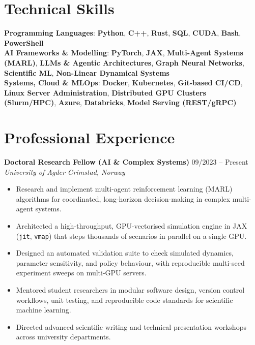 \documentclass[10pt,a4paper]{article}
\begin{document}
\section{Technical Skills}
\begin{itemize}[leftmargin=0.15in, label={}]
    \small{\item{
     \textbf{Programming Languages}{: \textbf{Python}, \textbf{C++}, \textbf{Rust}, \textbf{SQL}, \textbf{CUDA}, \textbf{Bash}, \textbf{PowerShell}} \\
     \textbf{AI Frameworks \& Modelling}{: \textbf{PyTorch}, \textbf{JAX}, \textbf{Multi-Agent Systems (MARL)}, \textbf{LLMs \& Agentic Architectures}, \textbf{Graph Neural Networks}, \textbf{Scientific ML}, \textbf{Non-Linear Dynamical Systems}} \\
     \textbf{Systems, Cloud \& MLOps}{: \textbf{Docker}, \textbf{Kubernetes}, \textbf{Git-based CI/CD}, \textbf{Linux Server Administration}, \textbf{Distributed GPU Clusters (Slurm/HPC)}, \textbf{Azure}, \textbf{Databricks}, \textbf{Model Serving (REST/gRPC)}}
    }}
\end{itemize}

\section{Professional Experience}
\textbf{Doctoral Research Fellow (AI \& Complex Systems)} \hfill 09/2023 -- Present \\
\textit{University of Agder} \hfill \textit{Grimstad, Norway}
\begin{itemize}[leftmargin=0.15in, label=$\bullet$]
    \item Research and implement multi-agent reinforcement learning (MARL) algorithms for coordinated, long-horizon decision-making in complex multi-agent systems.
    \item Architected a high-throughput, GPU-vectorised simulation engine in JAX (\texttt{jit}, \texttt{vmap}) that steps thousands of scenarios in parallel on a single GPU.
    \item Designed an automated validation suite to check simulated dynamics, parameter sensitivity, and policy behaviour, with reproducible multi-seed experiment sweeps on multi-GPU servers.
    \item Mentored student researchers in modular software design, version control workflows, unit testing, and reproducible code standards for scientific machine learning.
    \item Directed advanced scientific writing and technical presentation workshops across university departments.
\end{itemize}
\end{document}
